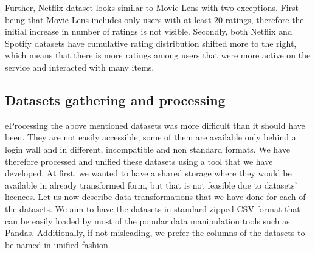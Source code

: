 Further, Netflix dataset looks similar to Movie Lens with two exceptions. First being that Movie Lens includes only users with at least 20 ratings, therefore the initial increase in number of ratings is not visible. Secondly, both Netflix and Spotify datasets have cumulative rating distribution shifted more to the right, which means that there is more ratings among users that were more active on the service and interacted with many items.




\subsection{Datasets gathering and processing} \label{subsec:04_single_user_datasets.gathering_processing}

eProcessing the above mentioned datasets was more difficult than it should have been. They are not easily accessible, some of them are available only behind a login wall and in different, incompatible and non standard formats. We have therefore processed and unified these datasets using a tool that we have developed. At first, we wanted to have a shared storage where they would be available in already transformed form, but that is not feasible due to datasets' licences. Let us now describe data transformations that we have done for each of the datasets. We aim to have the datasets in standard zipped CSV format that can be easily loaded by most of the popular data manipulation tools such as Pandas. Additionally, if not misleading, we prefer the columns of the datasets to be named in unified fashion.

